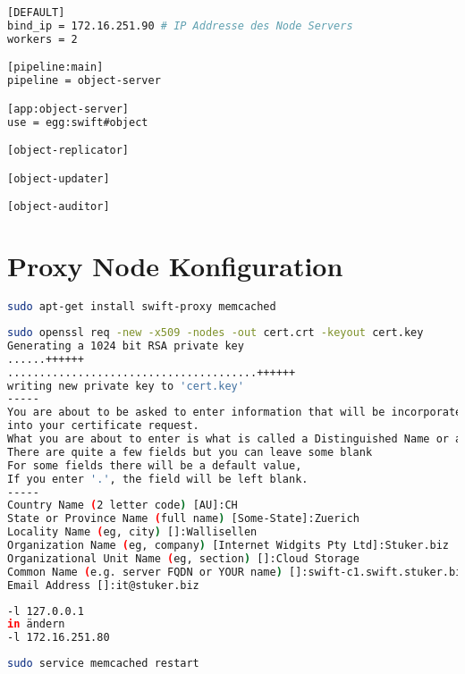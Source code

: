 \begin{lstlisting}[label=object-server.conf, language=Bash, caption=Object Server in /etc/swift/object-server.conf konfigurieren]
[DEFAULT]
bind_ip = 172.16.251.90 # IP Addresse des Node Servers
workers = 2

[pipeline:main]
pipeline = object-server

[app:object-server]
use = egg:swift#object

[object-replicator]

[object-updater]

[object-auditor]
\end{lstlisting}

\section{Proxy Node Konfiguration}
\begin{lstlisting}[label=paketeProxy, language=Bash, caption=Installation Proxy-Node Pakete ]
sudo apt-get install swift-proxy memcached
\end{lstlisting}

\begin{lstlisting}[label=zertifikat, language=Bash, caption=X.509 Zertifikats in /etc/swift erstellen ]
sudo openssl req -new -x509 -nodes -out cert.crt -keyout cert.key
Generating a 1024 bit RSA private key
......++++++
.......................................++++++
writing new private key to 'cert.key'
-----
You are about to be asked to enter information that will be incorporated
into your certificate request.
What you are about to enter is what is called a Distinguished Name or a DN.
There are quite a few fields but you can leave some blank
For some fields there will be a default value,
If you enter '.', the field will be left blank.
-----
Country Name (2 letter code) [AU]:CH
State or Province Name (full name) [Some-State]:Zuerich
Locality Name (eg, city) []:Wallisellen
Organization Name (eg, company) [Internet Widgits Pty Ltd]:Stuker.biz
Organizational Unit Name (eg, section) []:Cloud Storage
Common Name (e.g. server FQDN or YOUR name) []:swift-c1.swift.stuker.biz
Email Address []:it@stuker.biz
\end{lstlisting}

\begin{lstlisting}[label=memcachedconf, language=Bash, caption=MemCached in /etc/memcached.conf konfigurieren ]
-l 127.0.0.1
in ändern
-l 172.16.251.80
\end{lstlisting}

\begin{lstlisting}[label=startMemcached, language=Bash, caption=Memcached starten]
sudo service memcached restart
\end{lstlisting}

